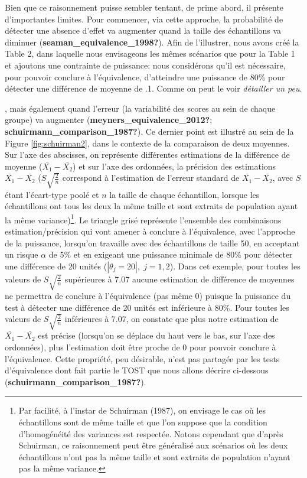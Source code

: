 \documentclass[
  english,
  man]{apa6}
\begin{document}
Bien que ce raisonnement puisse sembler tentant, de prime abord, il présente d'importantes limites. Pour commencer, via cette approche, la probabilité de détecter une absence d'effet va augmenter quand la taille des échantillons va diminuer (\textbf{seaman\_equivalence\_1998?}). Afin de l'illustrer, nous avons créé la Table 2, dans laquelle nous envisageons les mêmes scénarios que pour la Table 1 et ajoutons une contrainte de puissance: nous considérons qu'il est nécessaire, pour pouvoir conclure à l'équivalence, d'atteindre une puissance de 80\% pour détecter une différence de moyenne de .1. Comme on peut le voir \emph{détailler un peu}.

, mais également quand l'erreur (la variabilité des scores au sein de chaque groupe) va augmenter (\textbf{meyners\_equivalence\_2012?}; \textbf{schuirmann\_comparison\_1987?}). Ce dernier point est illustré au sein de la Figure \ref{fig:schuirman2}, dans le contexte de la comparaison de deux moyennes. Sur l'axe des abscisses, on représente différentes estimations de la différence de moyenne (\(\bar{X_1}-\bar{X_2}\)) et sur l'axe des ordonnées, la précision des estimations \(\bar{X_1}-\bar{X_2}\) (\(S\sqrt{\frac{2}{n}}\) correspond à l'estimation de l'erreur standard de \(\bar{X_1}-\bar{X_2}\), avec \(S\) étant l'écart-type poolé et \(n\) la taille de chaque échantillon, lorsque les échantillons ont tous les deux la même taille et sont extraits de population ayant la même variance)\footnote{Par facilité, à l'instar de Schuirman (1987), on envisage le cas où les échantillons sont de même taille et que l'on suppose que la condition d'homogénéité des variances est respectée. Notons cependant que d'après Schuirman, ce raisonnement peut être généralisé aux scénarios où les deux échantillons n'ont pas la même taille et sont extraits de population n'ayant pas la même variance.}. Le triangle grisé représente l'ensemble des combinaisons estimation/précision qui vont amener à conclure à l'équivalence, avec l'approche de la puissance, lorsqu'on travaille avec des échantillons de taille 50, en acceptant un risque \(\alpha\) de 5\% et en exigeant une puissance minimale de 80\% pour détecter une différence de 20 unités (\(|\theta_j=20|,\;j=1,2\)). Dans cet exemple, pour toutes les valeurs de \(S\sqrt{\frac{2}{n}}\) supérieures à 7.07 aucune estimation de différence de moyennes ne permettra de conclure à l'équivalence (pas même 0) puisque la puissance du test à détecter une différence de 20 unités est inférieure à 80\%. Pour toutes les valeurs de \(S\sqrt{\frac{2}{n}}\) inférieures à 7.07, on constate que plus notre estimation de \(\bar{X_1}-\bar{X_2}\) est précise (lorsqu'on se déplace du haut vers le bas, sur l'axe des ordonnées), plus l'estimation doit être proche de 0 pour pouvoir conclure à l'équivalence. Cette propriété, peu désirable, n'est pas partagée par les tests d'équivalence dont fait partie le TOST que nous allons décrire ci-dessous (\textbf{schuirmann\_comparison\_1987?}).
\end{document}
